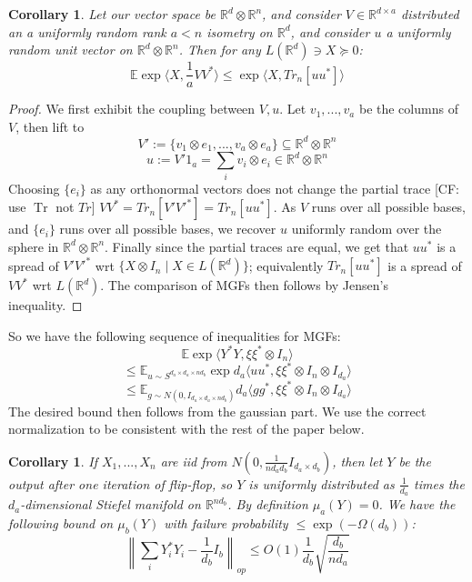 \documentclass[aos]{imsart}
\newtheorem{corollary}[theorem]{Corollary}
\theoremstyle{definition}
\DeclareMathOperator{\tr}{Tr}
\newcommand{\R}{{\mathbb{R}}}
\newcommand{\E}{\mathbb{E}}
\newcommand{\CF}[1]{{\color{purple}[CF: #1]}}
\begin{document}
\begin{corollary}
Let our vector space be $\R^{d} \otimes \R^{n}$, and consider $V \in \R^{d \times a}$ distributed an a uniformly random rank $a < n$ isometry on $\R^{d}$, and consider $u$ a uniformly random unit vector on $\R^{d} \otimes \R^{n}$. Then for any $L(\R^{d}) \ni X \succeq 0$:
\[ \E \exp \langle X, \frac{1}{a} V V^{*} \rangle \leq \exp \langle X, Tr_{n}[u u^{*}] \rangle      \]
\end{corollary}
\begin{proof}
We first exhibit the coupling between $V,u$. Let $v_{1}, ..., v_{a}$ be the columns of $V$, then lift to
\[ V' := \{v_{1} \otimes e_{1}, ..., v_{a} \otimes e_{a} \} \subseteq \R^{d} \otimes \R^{n}     \]
\[ u := V' 1_{a} = \sum_{i} v_{i} \otimes e_{i} \in \R^{d} \otimes \R^{n}      \]
Choosing $\{e_{i}\}$ as any orthonormal vectors does not change the partial trace  \CF{use $\tr$ not $Tr$} $V V^{*} = Tr_{n} [V' V'^{*}] = Tr_{n}[ u u^{*} ]$. As $V$ runs over all possible bases, and $\{e_{i}\}$ runs over all possible bases, we recover $u$ uniformly random over the sphere in $\R^{d} \otimes \R^{n}$. Finally since the partial traces are equal, we get that $u u^{*}$ is a spread of $V' V'^{*}$ wrt $\{X \otimes I_{n} \mid X \in L(\R^{d}) \}$; equivalently $Tr_{n}[u u^{*}]$ is a spread of $V V^{*}$ wrt $L(\R^{d})$. The comparison of MGFs then follows by Jensen's inequality.
\end{proof}

So we have the following sequence of inequalities for MGFs:
\[ \E \exp \langle Y^{*} Y, \xi \xi^{*} \otimes I_{n} \rangle \]
\[ \leq \E_{u \sim S^{d_{a} \times d_{a} \times n d_{b}}} \exp d_{a} \langle u u^{*}, \xi \xi^{*} \otimes I_{n} \otimes I_{d_{a}} \rangle \]
\[ \leq \E _{g \sim N(0,I_{d_{a} \times d_{a} \times n d_{b}})} d_{a}  \langle g g^{*}, \xi \xi^{*} \otimes I_{n} \otimes I_{d_{a}} \rangle       \]
The desired bound then follows from the gaussian part. We use the correct normalization to be consistent with the rest of the paper below.

\begin{corollary}
If $X_{1}, ..., X_{n}$ are iid from $N(0, \frac{1}{n d_{a} d_{b}} I_{d_{a} \times d_{b}})$, then let $Y$ be the output after one iteration of flip-flop, so $Y$ is uniformly distributed as $\frac{1}{d_{a}}$ times the $d_{a}$-dimensional Stiefel manifold on $\R^{n d_{b}}$. By definition $\mu_{a}(Y) = 0$. We have the following bound on $\mu_{b}(Y)$ with failure probability $\leq \exp(- \Omega(d_{b}))$:
\[ \left\| \sum_{i} Y_{i}^{*} Y_{i} - \frac{1}{d_{b}} I_{b}    \right\|_{op} \leq O(1) \frac{1}{d_{b}} \sqrt{ \frac{d_{b}}{n d_{a}}}   \]
\end{corollary}
\end{document}
